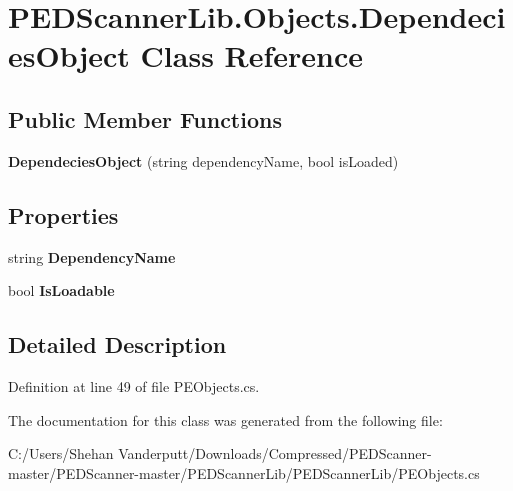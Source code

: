 \hypertarget{class_p_e_d_scanner_lib_1_1_objects_1_1_dependecies_object}{}\section{P\+E\+D\+Scanner\+Lib.\+Objects.\+Dependecies\+Object Class Reference}
\label{class_p_e_d_scanner_lib_1_1_objects_1_1_dependecies_object}
\subsection*{Public Member Functions}
\begin{DoxyCompactItemize}
\item 
\mbox{\label{class_p_e_d_scanner_lib_1_1_objects_1_1_dependecies_object_a10fa13dba74ca4133473412ef8cac23f}} 
{\bfseries Dependecies\+Object} (string dependency\+Name, bool is\+Loaded)
\end{DoxyCompactItemize}
\subsection*{Properties}
\begin{DoxyCompactItemize}
\item 
\mbox{\label{class_p_e_d_scanner_lib_1_1_objects_1_1_dependecies_object_a95c794338f70edb119b3b6a61cad0ede}} 
string {\bfseries Dependency\+Name}
\item 
\mbox{\label{class_p_e_d_scanner_lib_1_1_objects_1_1_dependecies_object_a4a294f73c171a49a0b5dfd6a549f9ce0}} 
bool {\bfseries Is\+Loadable}
\end{DoxyCompactItemize}


\subsection{Detailed Description}


Definition at line 49 of file P\+E\+Objects.\+cs.



The documentation for this class was generated from the following file\+:\begin{DoxyCompactItemize}
\item 
C\+:/\+Users/\+Shehan Vanderputt/\+Downloads/\+Compressed/\+P\+E\+D\+Scanner-\/master/\+P\+E\+D\+Scanner-\/master/\+P\+E\+D\+Scanner\+Lib/\+P\+E\+D\+Scanner\+Lib/P\+E\+Objects.\+cs\end{DoxyCompactItemize}
